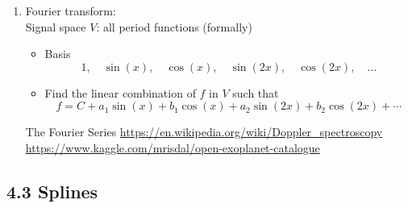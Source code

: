 \documentclass{article}
\theoremstyle{remark}
\begin{document}
\begin{enumerate}
\item Fourier transform: \\
Signal space $V$: all period functions (formally)
\begin{itemize}
\item Basis
$$
1,\quad \sin(x),\quad \cos(x),\quad \sin(2x),\quad \cos(2x),\quad\dots
$$
\item Find the linear combination of $f$ in $V$ such that
$$
f = C + a_1\sin(x) + b_1\cos(x)+a_2\sin(2x)+b_2\cos(2x)+\cdots
$$
\end{itemize}
\begin{center} 
The Fourier Series
\url{https://en.wikipedia.org/wiki/Doppler_spectroscopy} \\
\url{https://www.kaggle.com/mrisdal/open-exoplanet-catalogue}
\end{center}

\end{enumerate}


\subsection{4.3 Splines}
\end{document}
